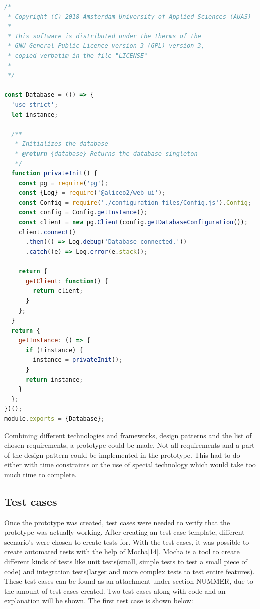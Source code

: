 \documentclass[paper=a4, fontsize=11pt,twoside]{scrartcl}	%
\begin{document}
\begin{lstlisting}[language=JavaScript, frame=single]
/*
 * Copyright (C) 2018 Amsterdam University of Applied Sciences (AUAS)
 *
 * This software is distributed under the therms of the
 * GNU General Public Licence version 3 (GPL) version 3,
 * copied verbatim in the file "LICENSE"
 *
 */

const Database = (() => {
  'use strict';
  let instance;

  /**
   * Initializes the database
   * @return {database} Returns the database singleton
   */
  function privateInit() {
    const pg = require('pg');
    const {Log} = require('@aliceo2/web-ui');
    const Config = require('./configuration_files/Config.js').Config;
    const config = Config.getInstance();
    const client = new pg.Client(config.getDatabaseConfiguration());
    client.connect()
      .then(() => Log.debug('Database connected.'))
      .catch((e) => Log.error(e.stack));

    return {
      getClient: function() {
        return client;
      }
    };
  }
  return {
    getInstance: () => {
      if (!instance) {
        instance = privateInit();
      }
      return instance;
    }
  };
})();
module.exports = {Database};

\end{lstlisting} 

Combining different technologies and frameworks, design patterns and the list of chosen requirements, a prototype could be made. Not all requirements and a part of the design pattern could be implemented in the prototype. This had to do either with time constraints or the use of special technology which would take too much time to complete.
\newpage
\subsection{Test cases}
Once the prototype was created, test cases were needed to verify that the prototype was actually working. After creating an test case template, different scenario's were chosen to create tests for. With the test cases, it was possible to create automated tests with the help of Mocha[14]. Mocha is a tool to create different kinds of tests like unit tests(small, simple tests to test a small piece of code) and integration tests(larger and more complex tests to test entire features). These test cases can be found as an attachment under section NUMMER, due to the amount of test cases created. Two test cases along with code and an explanation will be shown.
The first test case is shown below:
\end{document}
